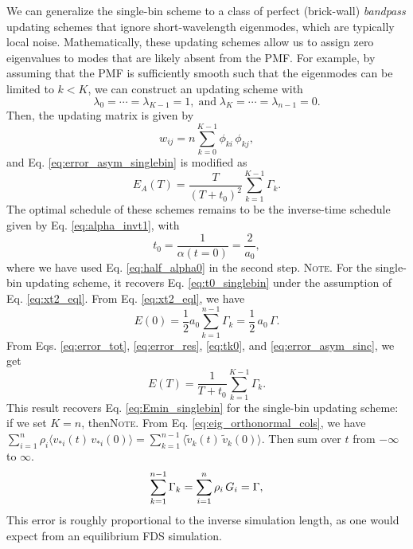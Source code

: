 \documentclass[reprint, superscriptaddress, floatfix]{revtex4-1}
\newcommand{\note}[1]{{\color{DarkGreen}\footnotesize \textsc{Note.} #1}}
\newcommand{\Err}{E}
\begin{document}
We can generalize
the single-bin scheme to a class of
perfect (brick-wall) \emph{bandpass} updating schemes
that ignore short-wavelength eigenmodes,
which are typically local noise.
%
Mathematically, these updating schemes
allow us to assign zero eigenvalues
to modes that are likely absent from the PMF.
%
For example,
by assuming
that the PMF is sufficiently smooth
such that the eigenmodes can be limited to $k < K$,
%
we can construct an updating scheme with
$$
\lambda_0 = \cdots = \lambda_{K-1} = 1,
\mathrm{\; and \;}
\lambda_K = \cdots = \lambda_{n-1} = 0.
$$
%
Then, the updating matrix is given by
%
$$w_{ij} = n \sum_{k=0}^{K-1} \phi_{ki} \, \phi_{kj},$$
%
and Eq. \eqref{eq:error_asym_singlebin} is modified as
%
\begin{equation}
  \Err_A(T)
  =
  \frac {       T     }
        { (T + t_0)^2 }
  \sum_{ k = 1 }^{K-1}
    \Gamma_k.
\label{eq:error_asym_sinc}
\end{equation}
%
The optimal schedule of these schemes
remains to be the inverse-time schedule
given by Eq. \eqref{eq:alpha_invt1},
%
with
%
\begin{equation}
  t_0
  =
  \frac{        1      }
       { \alpha(t = 0) }
  =
  \frac{  2  }
       { a_0 }
  ,
\label{eq:t0_sinc}
\end{equation}
%
where we have used Eq. \eqref{eq:half_alpha0}
in the second step.
%
\note{
For the single-bin updating scheme,
it recovers Eq. \eqref{eq:t0_singlebin}
under the assumption of Eq. \eqref{eq:xt2_eql}.
%
From Eq. \eqref{eq:xt2_eql}, we have
$$E(0) = \frac{1}{2} a_0 \sum_{k=1}^{n-1} \Gamma_k
= \frac{1}{2} \, a_0 \, \Gamma.$$
}
%
From Eqs. \eqref{eq:error_tot},
\eqref{eq:error_res},
\eqref{eq:tk0},
and
\eqref{eq:error_asym_sinc},
we get
%
\begin{equation}
  \Err(T)
  =
  \frac{   1     }
       { T + t_0 }
  \sum_{ k = 1 }^{ K - 1 }
    \Gamma_k
  .
\label{eq:error_sinc}
\end{equation}
%
This result recovers Eq. \eqref{eq:Emin_singlebin}
for the single-bin updating scheme:
if we set $K = n$, then\note{
  From Eq. \eqref{eq:eig_orthonormal_cols}, we have
  $\sum_{i=1}^n \rho_i \langle v_{*i}(t) \, v_{*i}(0) \rangle =\sum_{k=1}^{n-1} \langle {\tilde v}_k(t) \, {\tilde v}_k(0) \rangle.$
  Then sum over $t$ from $-\infty$ to $\infty$.
}
%
\begin{equation}
  \sum_{k=1}^{n-1} \Gamma_k
  = \sum_{i=1}^n \rho_i \, G_i = \Gamma
  ,
  \notag
\end{equation}
%
This error is roughly proportional to the inverse simulation length,
as one would expect from an equilibrium FDS simulation.
\end{document}
